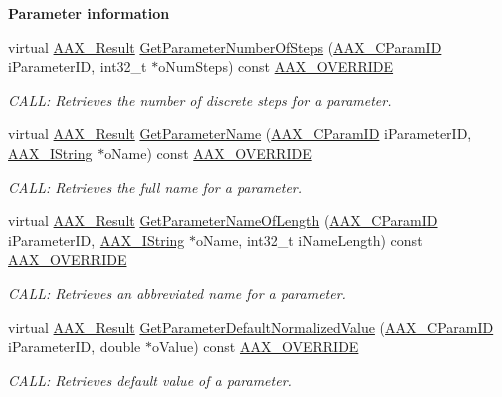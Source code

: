 \begin{Indent}{\bf Parameter information}
\begin{DoxyCompactItemize}
virtual \hyperlink{a00149_a4d8f69a697df7f70c3a8e9b8ee130d2f}{A\+A\+X\+\_\+\+Result} \hyperlink{a00018_a9b116dc0d30cc44191b3e3a63e4bcf17}{Get\+Parameter\+Number\+Of\+Steps} (\hyperlink{a00149_a1440c756fe5cb158b78193b2fc1780d1}{A\+A\+X\+\_\+\+C\+Param\+I\+D} i\+Parameter\+I\+D, int32\+\_\+t $\ast$o\+Num\+Steps) const \hyperlink{a00149_ac2f24a5172689ae684344abdcce55463}{A\+A\+X\+\_\+\+O\+V\+E\+R\+R\+I\+D\+E}
\begin{DoxyCompactList}\small\item\em C\+A\+L\+L\+: Retrieves the number of discrete steps for a parameter. \end{DoxyCompactList}\item 
virtual \hyperlink{a00149_a4d8f69a697df7f70c3a8e9b8ee130d2f}{A\+A\+X\+\_\+\+Result} \hyperlink{a00018_a3c983df7435d24d8c4c54c35f36c30b1}{Get\+Parameter\+Name} (\hyperlink{a00149_a1440c756fe5cb158b78193b2fc1780d1}{A\+A\+X\+\_\+\+C\+Param\+I\+D} i\+Parameter\+I\+D, \hyperlink{a00113}{A\+A\+X\+\_\+\+I\+String} $\ast$o\+Name) const \hyperlink{a00149_ac2f24a5172689ae684344abdcce55463}{A\+A\+X\+\_\+\+O\+V\+E\+R\+R\+I\+D\+E}
\begin{DoxyCompactList}\small\item\em C\+A\+L\+L\+: Retrieves the full name for a parameter. \end{DoxyCompactList}\item 
virtual \hyperlink{a00149_a4d8f69a697df7f70c3a8e9b8ee130d2f}{A\+A\+X\+\_\+\+Result} \hyperlink{a00018_a16356608f6cd2748ebee908427db7a0f}{Get\+Parameter\+Name\+Of\+Length} (\hyperlink{a00149_a1440c756fe5cb158b78193b2fc1780d1}{A\+A\+X\+\_\+\+C\+Param\+I\+D} i\+Parameter\+I\+D, \hyperlink{a00113}{A\+A\+X\+\_\+\+I\+String} $\ast$o\+Name, int32\+\_\+t i\+Name\+Length) const \hyperlink{a00149_ac2f24a5172689ae684344abdcce55463}{A\+A\+X\+\_\+\+O\+V\+E\+R\+R\+I\+D\+E}
\begin{DoxyCompactList}\small\item\em C\+A\+L\+L\+: Retrieves an abbreviated name for a parameter. \end{DoxyCompactList}\item 
virtual \hyperlink{a00149_a4d8f69a697df7f70c3a8e9b8ee130d2f}{A\+A\+X\+\_\+\+Result} \hyperlink{a00018_acb39f28a1c0c8bb0da9e8bd542664af3}{Get\+Parameter\+Default\+Normalized\+Value} (\hyperlink{a00149_a1440c756fe5cb158b78193b2fc1780d1}{A\+A\+X\+\_\+\+C\+Param\+I\+D} i\+Parameter\+I\+D, double $\ast$o\+Value) const \hyperlink{a00149_ac2f24a5172689ae684344abdcce55463}{A\+A\+X\+\_\+\+O\+V\+E\+R\+R\+I\+D\+E}
\begin{DoxyCompactList}\small\item\em C\+A\+L\+L\+: Retrieves default value of a parameter. \end{DoxyCompactList}\item 

\end{DoxyCompactItemize}
\end{Indent}
